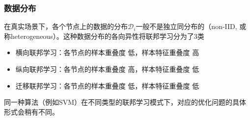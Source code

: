 \begin{frame}
\frametitle{数据分布}

在真实场景下，各个节点上的数据的分布$\mathcal{D}_i$一般不是独立同分布的（non-IID, 或称heterogeneous）。这种数据分布的各向异性将联邦学习分为了3类

\begin{itemize}
    \item 横向联邦学习：各节点的样本重叠度{\color{red} 低}，样本特征重叠度{\color{green} 高}
    \item 纵向联邦学习：各节点的样本重叠度{\color{green} 高}，样本特征重叠度{\color{red} 低}
    \item 迁移联邦学习：各节点的样本重叠度{\color{red} 低}，样本特征重叠度{\color{red} 低}
\end{itemize}

同一种算法（例如SVM）在不同类型的联邦学习模式下，对应的优化问题的具体形式会稍有不同。

\end{frame}


